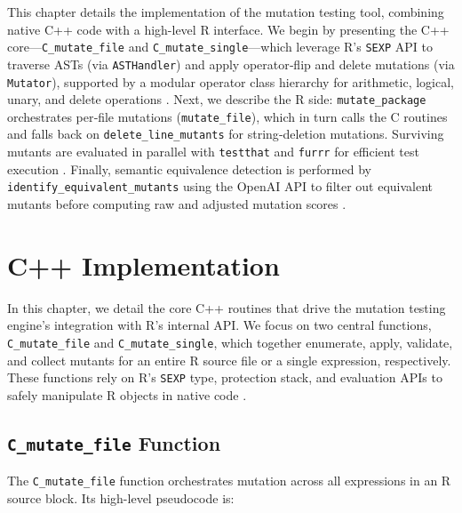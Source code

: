 

\begin{chapterabstract}
This chapter details the implementation of the mutation testing tool, combining native C++ code with a high-level R interface. We begin by presenting the C++ core—\texttt{C\_mutate\_file} and \texttt{C\_mutate\_single}—which leverage R’s \texttt{SEXP} API to traverse ASTs (via \texttt{ASTHandler}) and apply operator‐flip and delete mutations (via \texttt{Mutator}), supported by a modular operator class hierarchy for arithmetic, logical, unary, and delete operations \cite{R-base,wickham_pairlists}. Next, we describe the R side: \texttt{mutate\_package} orchestrates per‐file mutations (\texttt{mutate\_file}), which in turn calls the C routines and falls back on \texttt{delete\_line\_mutants} for string‐deletion mutations. Surviving mutants are evaluated in parallel with \texttt{testthat} and \texttt{furrr} for efficient test execution \cite{wickham2011testthat,Vaughan2020furrr}. Finally, semantic equivalence detection is performed by \texttt{identify\_equivalent\_mutants} using the OpenAI API to filter out equivalent mutants before computing raw and adjusted mutation scores \cite{wickham2011httr,ooms2014jsonlite,openai2023api}.

\end{chapterabstract}

\section{C++ Implementation}

In this chapter, we detail the core C++ routines that drive the mutation testing engine’s integration with R’s internal API. We focus on two central functions, \texttt{C\_mutate\_file} and \texttt{C\_mutate\_single}, which together enumerate, apply, validate, and collect mutants for an entire R source file or a single expression, respectively. These functions rely on R’s \texttt{SEXP} type, protection stack, and evaluation APIs to safely manipulate R objects in native code \cite{R-base}.

\subsection{\texttt{C\_mutate\_file} Function}

The \texttt{C\_mutate\_file} function orchestrates mutation across all expressions in an R source block.  Its high-level pseudocode is:

